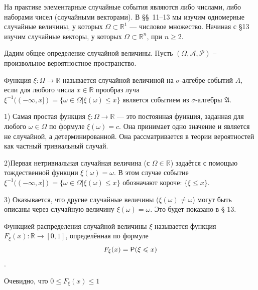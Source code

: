 На практике элементарные случайные события являются либо числами, либо наборами чисел (случайными векторами). В \S\S\ 11–13 мы изучим
одномерные случайные величины, у которых $\Omega\subset\mathbb{R}^1$ — числовое множество. Начиная с \S 13 изучим случайные векторы, у которых  
$\Omega\subset\mathbb{R}^n$, при $n \geqslant 2$.

Дадим общее определение случайной величины. Пусть $(\Omega, \mathcal{A}, \mathcal{P})$ -- произвольное вероятностное пространство.

\begin{definition}
\label{def:11.1}
	Функция $\xi : \Omega \rightarrow \mathbb{R}$ называется случайной величиной на $\sigma$-алгебре событий $A$, если для любого числа $x\in\mathbb{R}$ прообраз луча
	$\xi^{-1}((-\infty,x])=\{\omega\in\Omega|\xi(\omega)\leqslant x\}$
	 является событием из $\sigma$-алгебры $\mathfrak{A}$.
\end{definition}

\begin{zam}
\label{zam:11.2}
	
1) Самая простая функция $\xi : \Omega \rightarrow \mathbb{R}$ — это постоянная функция, заданная для любого $\omega \in \Omega$ по формуле $\xi(\omega)=c$. Она
принимает одно значение и является не случайной, а детерминированной.
Она рассматривается в теории вероятностей как частный тривиальный
случай.

2)Первая нетривиальная случайная величина (с $\Omega \in \mathbb{R}$) задаётся
с помощью тождественной функции $\xi(\omega) = \omega$. В этом случае событие
$\xi^{-1}((-\infty,x])=\{\omega\in\Omega|\xi(\omega)\leqslant x\}$ обозначают короче: $\{\xi \leqslant x\}$.

3) Оказывается, что другие случайные величины ($\xi(\omega) \neq \omega$) могут быть
описаны через случайную величину $\xi(\omega) = \omega$. Это будет показано в § 13.
\end{zam}

\begin{definition}
\label{def:11.3}
	Функцией распределения случайной величины $\xi$ называется функция $F_{\xi}(x) : \mathbb{R} \rightarrow [0, 1]$, определённая по формуле
$$F_{\xi}(x)=\P(\xi\leqslant x)$$.
\end{definition}

Очевидно, что $0\leqslant F_{\xi}(x)\leqslant 1$

